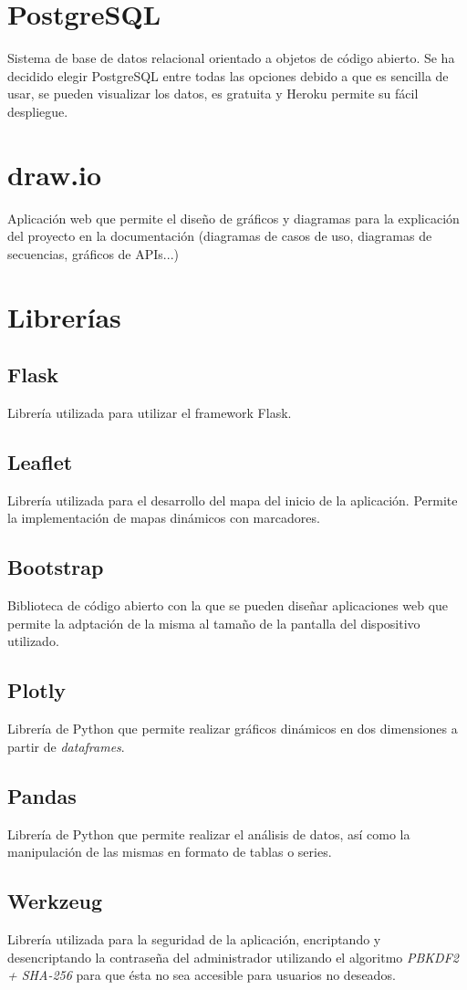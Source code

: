 \section{PostgreSQL}
Sistema de base de datos relacional orientado a objetos de código abierto. Se ha decidido elegir PostgreSQL entre todas las opciones debido a que es sencilla de usar, se pueden visualizar los datos, es gratuita y Heroku permite su fácil despliegue.

\section{draw.io}
Aplicación web que permite el diseño de gráficos y diagramas para la explicación del proyecto en la documentación (diagramas de casos de uso, diagramas de secuencias, gráficos de APIs...)

\section{Librerías}
\subsection{Flask}
Librería utilizada para utilizar el framework Flask.
\subsection{Leaflet}
Librería utilizada para el desarrollo del mapa del inicio de la aplicación. Permite la implementación de mapas dinámicos con marcadores.
\subsection{Bootstrap}
Biblioteca de código abierto con la que se pueden diseñar aplicaciones web que permite la adptación de la misma al tamaño de la pantalla del dispositivo utilizado.
\subsection{Plotly}
Librería de Python que permite realizar gráficos dinámicos en dos dimensiones a partir de \textit{dataframes}.
\subsection{Pandas}
Librería de Python que permite realizar el análisis de datos, así como la manipulación de las mismas en formato de tablas o series.
\subsection{Werkzeug}
Librería utilizada para la seguridad de la aplicación, encriptando y desencriptando la contraseña del administrador utilizando el algoritmo \textit{PBKDF2 + SHA-256} para que ésta no sea accesible para usuarios no deseados.
